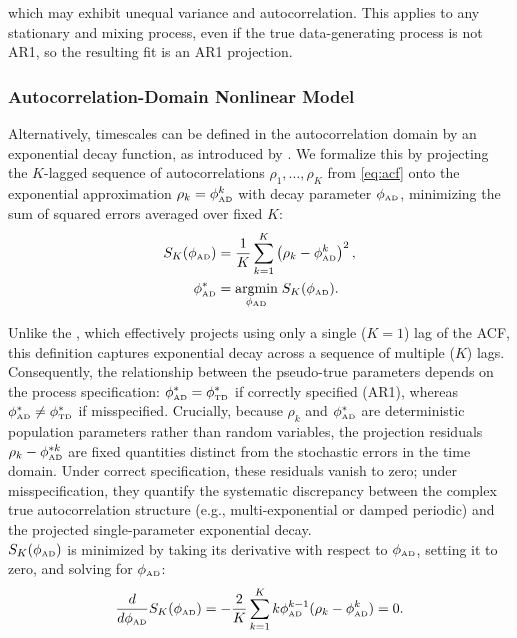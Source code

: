 \documentclass[docs/main.tex]{subfiles}
\begin{document}
\noindent which may exhibit unequal variance and autocorrelation. This applies to any stationary and mixing process, even if the true data-generating process is not AR1, so the resulting fit is an AR1 projection.

\subsubsection{Autocorrelation-Domain Nonlinear Model}\label{sec:autocorrelation-domain-nonlinear-model}

Alternatively, timescales can be defined in the autocorrelation domain by an exponential decay function, as introduced by \citet{murray_hierarchy_2014}. We formalize this by projecting the $K$-lagged sequence of autocorrelations $\rho_1, \dots, \rho_K$ from \eqref{eq:acf} onto the exponential approximation $\rho_k = \phi_{\scriptscriptstyle\text{AD}}^k$ with decay parameter $\phi_{\scriptscriptstyle\text{AD}}$, minimizing the sum of squared errors averaged over fixed $K$:
\begin{align}
    S_K(\phi_{\scriptscriptstyle\text{AD}}) &= \frac{1}{K} \sum_{k=1}^K \left( \rho_k - \phi_{\scriptscriptstyle\text{AD}}^k \right)^2, \label{eq:nlm_loss} \\
    \phi_{\scriptscriptstyle\text{AD}}^* &= \underset{\phi_{\scriptscriptstyle\text{AD}}}{\text{argmin}} \; S_K(\phi_{\scriptscriptstyle\text{AD}}). \label{eq:nlm_phi}
\end{align}

Unlike the , which effectively projects using only a single ($K=1$) lag of the ACF, this definition captures exponential decay across a sequence of multiple ($K$) lags. Consequently, the relationship between the pseudo-true parameters depends on the process specification: $\phi_{\scriptscriptstyle\text{AD}}^* = \phi_{\scriptscriptstyle\text{TD}}^*$ if correctly specified (AR1), whereas $\phi_{\scriptscriptstyle\text{AD}}^* \ne \phi_{\scriptscriptstyle\text{TD}}^*$ if misspecified. Crucially, because $\rho_k$ and $\phi_{\scriptscriptstyle\text{AD}}^*$ are deterministic population parameters rather than random variables, the projection residuals $\rho_k - \phi_{\scriptscriptstyle\text{AD}}^{*k}$ are fixed quantities distinct from the stochastic errors in the time domain. Under correct specification, these residuals vanish to zero; under misspecification, they quantify the systematic discrepancy between the complex true autocorrelation structure (e.g., multi-exponential or damped periodic) and the projected single-parameter exponential decay.\\

$S_K(\phi_{\scriptscriptstyle\text{AD}})$ is minimized by taking its derivative with respect to $\phi_{\scriptscriptstyle\text{AD}}$, setting it to zero, and solving for $\phi_{\scriptscriptstyle\text{AD}}$:
\begin{align}
    \frac{d}{d\phi_{\scriptscriptstyle\text{AD}}} S_K(\phi_{\scriptscriptstyle\text{AD}}) = -\frac{2}{K} \sum_{k=1}^K k\phi_{\scriptscriptstyle\text{AD}}^{k-1}(\rho_k - \phi_{\scriptscriptstyle\text{AD}}^k) = 0.
\end{align}
\end{document}
